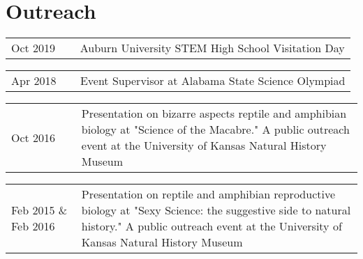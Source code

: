 \section*{Outreach}

\begin{tabular}{ p{0.2\linewidth} p{0.8\linewidth} }
    Oct 2019  & Auburn University STEM High School Visitation Day \\
\end{tabular}

\bigskip
\noindent
\begin{tabular}{ p{0.2\linewidth} p{0.8\linewidth} }
    Apr 2018  & Event Supervisor at Alabama State Science Olympiad \\
\end{tabular}

\bigskip
\noindent
\begin{tabular}{ p{0.2\linewidth} p{0.8\linewidth} }
        Oct 2016 & Presentation on bizarre aspects reptile and amphibian biology at "Science of the Macabre." A public outreach event at the University of Kansas Natural History Museum %
\end{tabular}

\bigskip
\noindent
\begin{tabular}{ p{0.2\linewidth} p{0.8\linewidth} }
        Feb 2015 \& Feb 2016 & Presentation on reptile and amphibian reproductive biology at "Sexy Science: the suggestive side to natural history." A public outreach event at the University of Kansas Natural History Museum %
\end{tabular}
